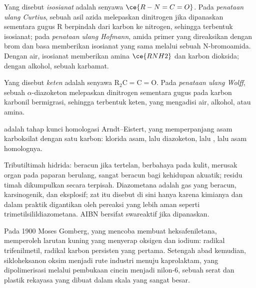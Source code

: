 \begin{definition}\label{def:b3:radicals-carbenes:curtius}
Yang disebut \emph{isosianat} adalah senyawa $\ce{R-N=C=O}$. Pada \emph{penataan ulang Curtius},
 sebuah asil azida melepaskan dinitrogen jika
dipanaskan sementara gugus R berpindah dari karbon ke nitrogen, sehingga terbentuk isosianat;
pada \emph{penataan ulang Hofmann}, amida primer
yang direaksikan dengan brom dan basa memberikan isosianat yang sama melalui
sebuah N-bromoamida. Dengan air, isosianat memberikan amina $\ce{RNH2}$ dan karbon
dioksida; dengan alkohol, sebuah karbamat.
\end{definition}

\begin{definition}\label{def:b3:radicals-carbenes:wolff}
Yang disebut \emph{keten} adalah senyawa $\mathrm{R_2C{=}C{=}O}$. Pada \emph{penataan ulang Wolff},
 sebuah $\alpha$-diazoketon melepaskan dinitrogen
sementara gugus pada karbon karbonil bermigrasi, sehingga terbentuk keten, yang mengadisi
air, alkohol, atau amina.
\end{definition}

 adalah tahap kunci homologasi Arndt--Eistert,
yang memperpanjang asam karboksilat dengan satu karbon: klorida asam, lalu
diazoketon, lalu , lalu asam homolognya.

\begin{safety}{}
Tributiltimah hidrida: beracun jika tertelan, berbahaya pada kulit, merusak organ pada
paparan berulang, sangat beracun bagi kehidupan akuatik; residu timah dikumpulkan
secara terpisah. Diazometana adalah gas yang beracun, karsinogenik, dan eksplosif; zat itu
disebut di sini hanya karena kimianya dan dalam praktik digantikan oleh pereaksi yang lebih aman
seperti trimetilsilildiazometana. AIBN bersifat swareaktif jika dipanaskan.
\end{safety}

\begin{history}
Pada 1900 Moses Gomberg, yang mencoba membuat heksafeniletana, memperoleh larutan
kuning yang menyerap oksigen dan iodium: radikal trifenilmetil, radikal karbon
persisten yang pertama. Setengah abad kemudian, 
sikloheksanon oksim menjadi rute industri menuju kaprolaktam, yang dipolimerisasi melalui
pembukaan cincin menjadi nilon-6, sebuah serat dan plastik rekayasa yang dibuat dalam skala
yang sangat besar.
\end{history}

